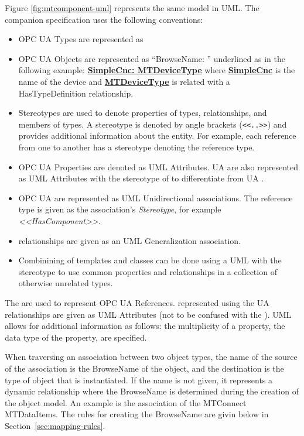 Figure \ref{fig:mtcomponent-uml} represents the same model in UML. The companion specification uses the following conventions:

\begin{itemize}
  \item OPC UA Types are represented as 
  \item OPC UA Objects are represented as ``\gls{BrowseName}: '' underlined as in the following example: \textbf{\underline{SimpleCnc: MTDeviceType}} where \textbf{\underline{SimpleCnc}} is the name of the device and  \textbf{\underline{MTDeviceType}} is related with a \gls{HasTypeDefinition} relationship.
  \item Stereotypes are used to denote properties of types, relationships, and members of types. A stereotype is denoted by angle brackets (\texttt{<<..>>}) and provides additional information about the entity. For example, each reference from one  to another has a stereotype denoting the reference type.
  \item OPC UA Properties are denoted as UML Attributes. UA  are also represented as UML Attributes with the stereotype of  to differentiate from UA .
  \item OPC UA   are represented as UML Unidirectional associations. The reference type is given as the association's \textit{Stereotype}, for example \textit{<<HasComponent>>}. 
  \item {} relationships are given as an UML Generalization association.
  \item Combinining of templates and classes can be done using a UML  with the stereotype  to use common properties and relationships in a collection of otherwise unrelated types.
\end{itemize}

The  are used to represent OPC UA References.  represented using the UA  relationships are given as UML Attributes (not to be confused with the ). UML allows for additional information as follows:  the multiplicity of a property, the data type of the property, are specified.


\FloatBarrier

When traversing an association between two object types, the name of the source of the association is the \gls{BrowseName} of the object, and the destination is the type of object that is instantiated. If the name is not given, it represents a dynamic relationship where the \gls{BrowseName} is determined during the creation of the object model. An example is the association of the MTConnect \glspl{MTDataItem}. The rules for creating the \gls{BrowseName} are givin below in Section~\ref{sec:mapping-rules}.

